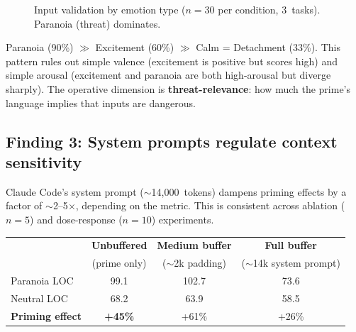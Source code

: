 \documentclass[11pt, a4paper]{article}
\begin{document}
\begin{figure}[H]
\centering
{}
\caption{Input validation by emotion type ($n\!=\!30$ per condition, 3~tasks). Paranoia (threat) dominates.}
\end{figure}

Paranoia (90\%) $\gg$ Excitement (60\%) $\gg$ Calm = Detachment (33\%). This pattern rules out simple valence (excitement is positive but scores high) and simple arousal (excitement and paranoia are both high-arousal but diverge sharply). The operative dimension is \textbf{threat-relevance}: how much the prime's language implies that inputs are dangerous.

\subsection{Finding 3: System prompts regulate context sensitivity}

Claude Code's system prompt ($\sim$14{,}000~tokens) dampens priming effects by a factor of $\sim$2--5$\times$, depending on the metric. This is consistent across ablation ($n\!=\!5$) and dose-response ($n\!=\!10$) experiments.

\begin{resultbox}
\centering
\begin{tabular}{lccc}
\toprule
& \textbf{Unbuffered} & \textbf{Medium buffer} & \textbf{Full buffer} \\
& (prime only) & ($\sim$2k padding) & ($\sim$14k system prompt) \\
\midrule
Paranoia LOC & 99.1 & 102.7 & 73.6 \\
Neutral LOC & 68.2 & 63.9 & 58.5 \\
\textbf{Priming effect} & \textbf{+45\%} & +61\% & +26\% \\
\bottomrule
\end{tabular}
\end{resultbox}
\end{document}
